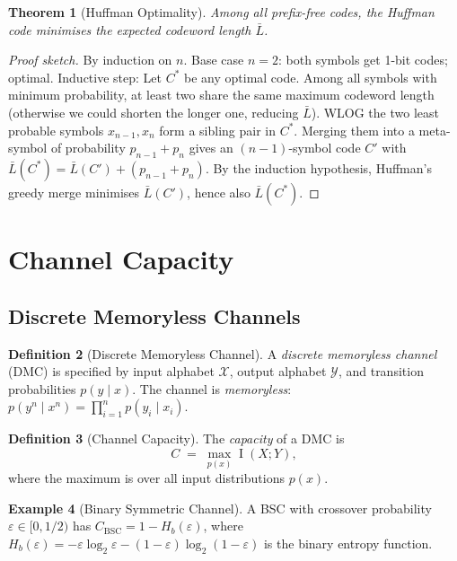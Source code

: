 \documentclass[12pt,a4paper]{amsart}
\newtheorem{theorem}{Theorem}[section]
\theoremstyle{definition}
\newtheorem{definition}[theorem]{Definition}
\newtheorem{example}[theorem]{Example}
\theoremstyle{remark}
\DeclareMathOperator{\MI}{I}
\begin{document}
\begin{theorem}[Huffman Optimality]\label{thm:huffman}
Among all prefix-free codes, the Huffman code minimises the expected codeword
length $\bar{L}$.
\end{theorem}
\begin{proof}[Proof sketch]
By induction on $n$. Base case $n=2$: both symbols get 1-bit codes; optimal.
Inductive step: Let $C^*$ be any optimal code. Among all symbols with minimum
probability, at least two share the same maximum codeword length (otherwise
we could shorten the longer one, reducing $\bar{L}$). WLOG the two least
probable symbols $x_{n-1}, x_n$ form a sibling pair in $C^*$. Merging them into
a meta-symbol of probability $p_{n-1}+p_n$ gives an $(n-1)$-symbol code $C'$
with $\bar{L}(C^*) = \bar{L}(C') + (p_{n-1}+p_n)$. By the induction hypothesis,
Huffman's greedy merge minimises $\bar{L}(C')$, hence also $\bar{L}(C^*)$.
\end{proof}

\section{Channel Capacity}

\subsection{Discrete Memoryless Channels}

\begin{definition}[Discrete Memoryless Channel]
A \emph{discrete memoryless channel} (DMC) is specified by input alphabet
$\mathcal{X}$, output alphabet $\mathcal{Y}$, and transition probabilities
$p(y \mid x)$. The channel is \emph{memoryless}: $p(y^n \mid x^n) =
\prod_{i=1}^n p(y_i \mid x_i)$.
\end{definition}

\begin{definition}[Channel Capacity]
The \emph{capacity} of a DMC is
\begin{equation}\label{eq:capacity}
  C \;=\; \max_{p(x)} \MI(X;Y),
\end{equation}
where the maximum is over all input distributions $p(x)$.
\end{definition}

\begin{example}[Binary Symmetric Channel]
A BSC with crossover probability $\varepsilon \in [0,1/2)$ has
$C_{\mathrm{BSC}} = 1 - H_b(\varepsilon)$,
where $H_b(\varepsilon) = -\varepsilon\log_2\varepsilon -
(1-\varepsilon)\log_2(1-\varepsilon)$ is the binary entropy function.
\end{example}
\end{document}
